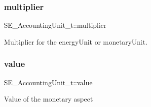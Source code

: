 \subsubsection{\texorpdfstring{multiplier}{multiplier}}
{\footnotesize\ttfamily S\+E\+\_\+\+Accounting\+Unit\+\_\+t\+::multiplier}

Multiplier for the \textquotesingle{}energy\+Unit\textquotesingle{} or \textquotesingle{}monetary\+Unit\textquotesingle{}. \mbox{\label{group__AccountingUnit_ga3c90f530724e607bdb4b133c0fae9df4}} 
\subsubsection{\texorpdfstring{value}{value}}
{\footnotesize\ttfamily S\+E\+\_\+\+Accounting\+Unit\+\_\+t\+::value}

Value of the monetary aspect 